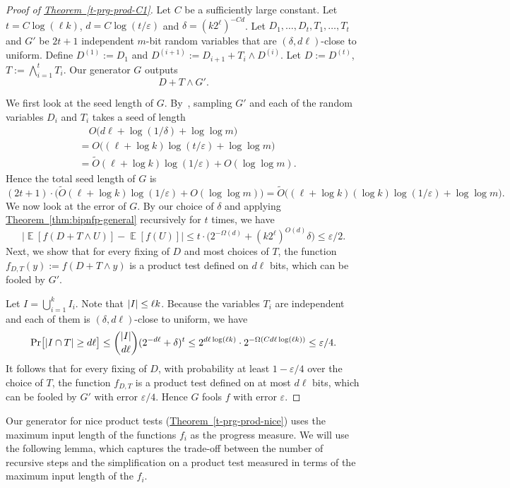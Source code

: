 \documentclass[11pt]{article}
\numberwithin{equation}{section}
\theoremstyle{definition}
\theoremstyle{plain}
\newcommand{\expref}[2]{\hyperref[#2]{#1~\ref{#2}}}
\def\eps{\varepsilon}
\def\Blocklength{\ell}
\DeclarePairedDelimiter{\abs}{\lvert}{\rvert}
\DeclareMathOperator*{\E}{\mathbb{E}}                 %
\begin{document}
  \begin{proof}[Proof of {\expref{Theorem}{t-prg-prod-C1}}]
    Let $C$ be a sufficiently large constant.
    Let $t = C\log(\Blocklength k)$, $d = C \log(t/\eps)$ and $\delta = (k2^\Blocklength)^{-Cd}$.
    Let $D_1, \ldots, D_t, T_1, \ldots, T_t$ and $G'$ be $2t+1$ independent 
    $m$-bit  %
    random variables
    that are $(\delta, d \Blocklength)$-close to uniform.
    Define $D^{(1)} := D_1$ and $D^{(i+1)} := D_{i+1} + T_i \wedge D^{(i)}$.
    Let $D := D^{(t)}$, $T := \bigwedge_{i=1}^t T_i$.
    Our generator $G$ outputs 
  	\[
  		D + T \wedge G' .
  	\]
  
    We first look at the seed length of $G$.
    By~\cite[Lemma~4.2]{NaorN93}, sampling $G'$ and each of the random variables $D_i$ and $T_i$ takes a seed of length
    \begin{align*}
      &\quad O \bigl( d \Blocklength + \log(1/\delta) + \log\log m \bigr) \\
      &= O \bigl((\Blocklength + \log k) \log(t/\eps) + \log\log m \bigr) \\
      &= \tilde O(\Blocklength + \log k) \log(1/\eps) + O(\log\log m).
    \end{align*}
    Hence the total seed length of $G$ is 
    \[
      (2t + 1) \cdot \bigl( \tilde O(\Blocklength + \log k) \log(1/\eps) + O(\log\log m) \bigr)
      = \tilde O \bigl( (\ell + \log k) (\log k) \log(1/\eps) + \log\log m \bigr) .
    \]
    \medskip
    We now look at the error of $G$.
    By our choice of $\delta$ and applying \expref{Theorem}{thm:bipnfp-general} recursively for $t$ times, we have
    \[
      \bigl| \E[f(D + T \wedge U)] - \E[f(U)] \bigr|
      \le t \cdot \bigl( 2^{-\Omega(d)} + (k 2^\Blocklength)^{O(d)} \delta \bigr)
      \le \eps/2 .
    \]
    Next, we show that for every fixing of $D$ and most choices of $T$, the function $f_{D,T}(y) := f(D + T \wedge y)$ is a product test defined on $d \Blocklength$ bits, which can be fooled by $G'$.
    
    Let $I = \bigcup_{i=1}^k I_i$.
    Note that $\abs{I} \le \Blocklength k$.
    Because the variables $T_i$ are independent and each of them is $(\delta, d \Blocklength)$-close to uniform, we have
    \[
      \Pr \bigl[ \abs{I \cap T} \ge d \Blocklength \bigr]
      \le \binom{\abs{I}}{d \Blocklength} (2^{-d \Blocklength} + \delta)^t
      \le 2^{d \Blocklength \log(\Blocklength k)} \cdot 2^{-\Omega(C d \Blocklength \log(\Blocklength k))} 
      \le \eps/4.
    \]
    It follows that for every fixing of $D$, with probability at least $1 - \eps/4$ over the choice of $T$, the function $f_{D,T}$ is a product test defined on at most $d \Blocklength$ bits, which can be fooled by $G'$ with error $\eps/4$.
    Hence $G$ fools $f$ with error $\eps$.
  \end{proof}
  Our generator for nice product tests (\expref{Theorem}{t-prg-prod-nice}) uses the maximum input length of the functions $f_i$ as the progress measure. 
  We will use the following lemma, which captures the trade-off between the number of recursive steps and the simplification on a product test measured in terms of the maximum input length of the $f_i$.
\end{document}
